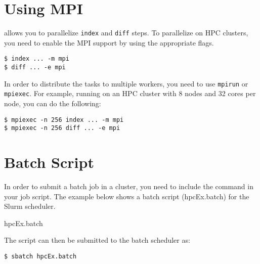 \section{Using MPI}
\systemname allows you to parallelize \texttt{index} and \texttt{diff}
steps. To parallelize on HPC clusters, you need to enable the MPI support
by using the appropriate flags.

\texttt{\$ \appcmd index ... -m mpi}\\
\texttt{\$ \appcmd diff ... -e mpi}

In order to distribute the tasks to multiple workers, you need to
use \texttt{mpirun} or \texttt{mpiexec}. For example, running \systemname
on an HPC cluster with 8 nodes and 32 cores per node, you can do
the following:

\texttt{\$ mpiexec -n 256 \appcmd index ... -m mpi}\\
\texttt{\$ mpiexec -n 256 \appcmd diff ... -e mpi}

\section{Batch Script}
In order to submit a batch job in a cluster, you need to include
the \systemname command in your job script. The example below shows
a batch script (hpcEx.batch) for the Slurm scheduler.

hpcEx.batch


The script can then be submitted to the batch scheduler as:

\texttt{\$ sbatch hpcEx.batch}
